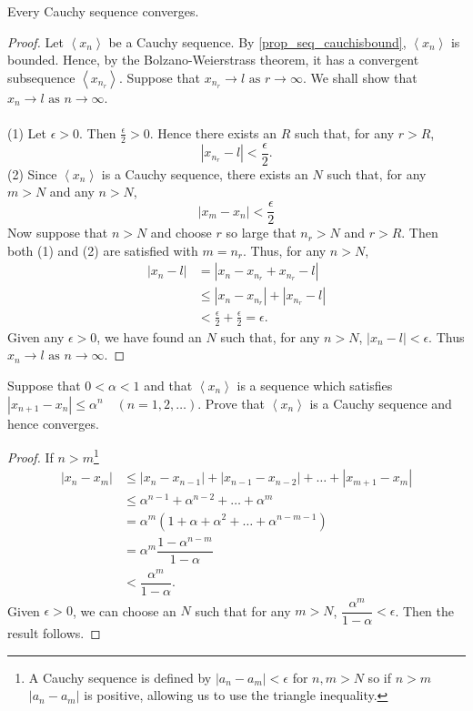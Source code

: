 \documentclass[10pt, a4paper]{article}
\newcommand{\limas}[3][n]{#2 \rightarrow #3 \text{ as } #1 \rightarrow \infty}
\newcommand{\seq}[1][x_n]{\left\langle #1 \right\rangle}
\begin{document}
\begin{theorem}\label{thm_seq_cauchconverge}
    Every Cauchy sequence converges.
    \begin{proof}
        Let $\seq$ be a Cauchy sequence. By \autoref{prop_seq_cauchisbound}, $\seq$ is bounded. Hence, by the Bolzano-Weierstrass theorem, it has a convergent subsequence $\seq[x_{n_r}]$. Suppose that $\limas[r]{x_{n_r}}{l}$. We shall show that $\limas{x_n}{l}$. \\
        \\
        (1) Let $\epsilon > 0$. Then $\frac{\epsilon}{2} > 0$. Hence there exists an $R$ such that, for any $r > R$, $$|x_{n_r} - l| < \frac{\epsilon}{2}.$$
        (2) Since $\seq$ is a Cauchy sequence, there exists an $N$ such that, for any $m > N$ and any $n > N$, $$|x_m - x_n| < \frac{\epsilon}{2}$$
        Now suppose that $n > N$ and choose $r$ so large that $n_r > N$ and $r > R$. Then both (1) and (2) are satisfied with $m = n_r$. Thus, for any $n > N$,
        \begin{align*}
            |x_n - l| &= |x_n - x_{n_r} + x_{n_r} - l| \\
            &\leq |x_n - x_{n_r}| + |x_{n_r} - l| \\
            &< \frac{\epsilon}{2} + \frac{\epsilon}{2} = \epsilon.
        \end{align*}
        Given any $\epsilon > 0$, we have found an $N$ such that, for any $n > N$, $|x_n - l| < \epsilon$. Thus $\limas{x_n}{l}$.
    \end{proof}
\end{theorem}

\begin{example}
    Suppose that $0 < \alpha < 1$ and that $\seq$ is a sequence which satisfies $|x_{n + 1} - x_n| \leq \alpha ^ n\quad(n = 1, 2, \dotsc)$. Prove that $\seq$ is a Cauchy sequence and hence converges.
    \begin{proof}
        If $n > m$\footnote{A Cauchy sequence is defined by $|a_n - a_m| < \epsilon$ for $n, m > N$ so if $n > m$ $|a_n - a_m|$ is positive, allowing us to use the triangle inequality.} \\
        \begin{align*}
            |x_n - x_m| &\leq |x_n - x_{n - 1}| + |x_{n - 1} - x_{n - 2}| + \dotsc + |x_{m + 1} - x_m| \\
            &\leq \alpha ^ {n - 1} + \alpha ^ {n - 2} + \dotsc + \alpha ^ m \\
            &= \alpha ^ m (1 + \alpha + \alpha ^ 2 + \dotsc + \alpha ^ {n - m - 1}) \\
            &= \alpha ^ m \dfrac{1 - \alpha ^ {n - m}}{1 - \alpha} \\
            &< \dfrac{\alpha ^ m}{1 - \alpha}.
        \end{align*}
        Given $\epsilon > 0$, we can choose an $N$ such that for any $m > N$, $\dfrac{\alpha ^ m}{1 - \alpha} < \epsilon$. Then the result follows.
    \end{proof}
\end{example}
\end{document}
